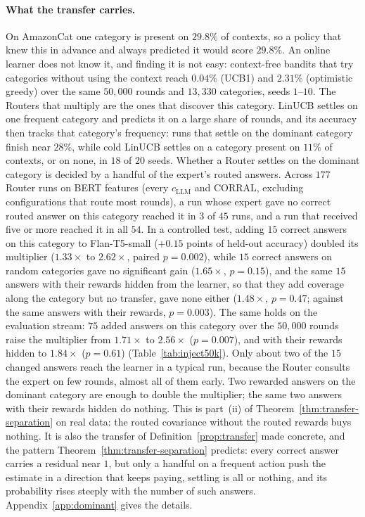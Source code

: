 \documentclass{article}
\theoremstyle{definition}
\theoremstyle{remark}
\theoremstyle{remark}
\begin{document}
\paragraph{What the transfer carries.} On AmazonCat one category is present on
$29.8\%$ of contexts, so a policy that knew this in advance and always
predicted it would score $29.8\%$. An online learner does not know it, and
finding it is not easy: context-free bandits that try categories without
using the context reach $0.04\%$ (UCB1) and $2.31\%$ (optimistic greedy) over
the same $50{,}000$ rounds and $13{,}330$ categories, seeds $1$--$10$. The
Routers that multiply are the ones that discover this category. LinUCB
settles on one frequent category and predicts it on a large share of rounds,
and its accuracy then tracks that category's frequency: runs that settle on
the dominant category finish near $28\%$, while cold LinUCB settles on a
category present on $11\%$ of contexts, or on none, in $18$ of $20$ seeds.
Whether a Router settles on the dominant category is decided by a handful of
the expert's routed answers. Across $177$ Router runs on BERT features (every
$c_{\mathrm{LLM}}$ and CORRAL, excluding configurations that route most rounds), a run whose
expert gave no correct routed answer on this category reached it in $3$ of
$45$ runs, and a run that received five or more reached it in all $54$. In a
controlled test, adding $15$ correct answers on this category to
Flan-T5-small ($+0.15$ points of held-out accuracy) doubled its multiplier
($1.33\times$ to $2.62\times$, paired $p=0.002$), while $15$ correct answers on
random categories gave no significant gain ($1.65\times$, $p=0.15$), and the
same $15$ answers with their rewards hidden from the learner, so that they add
coverage along the category but no transfer, gave none either ($1.48\times$,
$p=0.47$; against the same answers with their rewards, $p=0.003$). The same
holds on the evaluation stream: $75$ added answers on this category over the
$50{,}000$ rounds raise the multiplier from $1.71\times$ to $2.56\times$
($p=0.007$), and with their rewards hidden to $1.84\times$ ($p=0.61$)
(Table~\ref{tab:inject50k}). Only about
two of the $15$ changed answers reach the learner in a typical run, because
the Router consults the expert on few rounds, almost all of them early. Two
rewarded answers on the dominant category are enough to double the
multiplier; the same two answers with their rewards hidden do nothing. This is
part~(ii) of Theorem~\ref{thm:transfer-separation} on real data: the routed
covariance without the routed rewards buys nothing. It is also
the transfer of Definition~\ref{prop:transfer} made concrete, and the pattern
Theorem~\ref{thm:transfer-separation} predicts: every correct answer carries a
residual near $1$, but only a handful on a frequent action push the estimate
in a direction that keeps paying, settling is all or nothing, and its
probability rises steeply with the number of such answers. Appendix~\ref{app:dominant} gives
the details.
\end{document}
